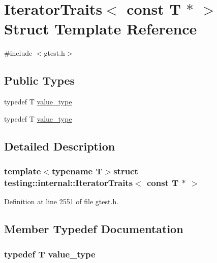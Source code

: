 \hypertarget{structtesting_1_1internal_1_1IteratorTraits_3_01const_01T_01_5_01_4}{\section{\-Iterator\-Traits$<$ const \-T $\ast$ $>$ \-Struct \-Template \-Reference}
\label{da/da3/structtesting_1_1internal_1_1IteratorTraits_3_01const_01T_01_5_01_4}
}


{\ttfamily \#include $<$gtest.\-h$>$}

\subsection*{\-Public \-Types}
\begin{DoxyCompactItemize}
\item 
typedef \-T \hyperlink{structtesting_1_1internal_1_1IteratorTraits_3_01const_01T_01_5_01_4_a265a253612b46abed17c61b0a5e5ce30}{value\-\_\-type}
\item 
typedef \-T \hyperlink{structtesting_1_1internal_1_1IteratorTraits_3_01const_01T_01_5_01_4_a265a253612b46abed17c61b0a5e5ce30}{value\-\_\-type}
\end{DoxyCompactItemize}


\subsection{\-Detailed \-Description}
\subsubsection*{template$<$typename T$>$struct testing\-::internal\-::\-Iterator\-Traits$<$ const T $\ast$ $>$}



\-Definition at line 2551 of file gtest.\-h.



\subsection{\-Member \-Typedef \-Documentation}
\hypertarget{structtesting_1_1internal_1_1IteratorTraits_3_01const_01T_01_5_01_4_a265a253612b46abed17c61b0a5e5ce30}{
\subsubsection[{value\-\_\-type}]{\setlength{\rightskip}{0pt plus 5cm}typedef \-T {\bf value\-\_\-type}}}\label{da/da3/structtesting_1_1internal_1_1IteratorTraits_3_01const_01T_01_5_01_4_a265a253612b46abed17c61b0a5e5ce30}


